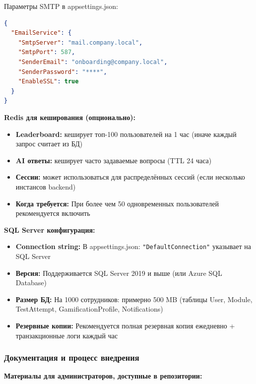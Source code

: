 Параметры SMTP в appsettings.json:

\begin{lstlisting}[language=json, caption=SMTP конфигурация]
{
  "EmailService": {
    "SmtpServer": "mail.company.local",
    "SmtpPort": 587,
    "SenderEmail": "onboarding@company.local",
    "SenderPassword": "****",
    "EnableSSL": true
  }
}
\end{lstlisting}

\textbf{Redis для кеширования (опционально):}

\begin{itemize}
	\item \textbf{Leaderboard:} кеширует топ-100 пользователей на 1 час (иначе каждый запрос считает из БД)
	\item \textbf{AI ответы:} кеширует часто задаваемые вопросы (TTL 24 часа)
	\item \textbf{Сессии:} может использоваться для распределённых сессий (если несколько инстансов backend)
	\item \textbf{Когда требуется:} При более чем 50 одновременных пользователей рекомендуется включить
\end{itemize}

\textbf{SQL Server конфигурация:}

\begin{itemize}
	\item \textbf{Connection string:} В appsettings.json: \texttt{"DefaultConnection"} указывает на SQL Server
	\item \textbf{Версия:} Поддерживается SQL Server 2019 и выше (или Azure SQL Database)
	\item \textbf{Размер БД:} На 1000 сотрудников: примерно 500 MB (таблицы User, Module, TestAttempt, GamificationProfile, Notifications)
	\item \textbf{Резервные копии:} Рекомендуется полная резервная копия ежедневно + транзакционные логи каждый час
\end{itemize}

\subsubsection*{Документация и процесс внедрения}

\textbf{Материалы для администраторов, доступные в репозитории:}

